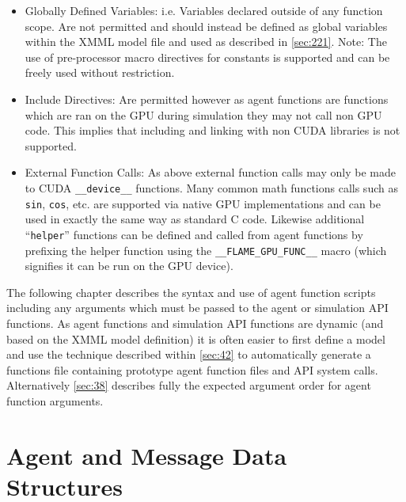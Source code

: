 \documentclass[11pt, a4paper, onecolumn, oneside]{report}
\begin{document}
\begin{itemize}
\item Globally Defined Variables: i.e. Variables declared outside of any function scope.
    Are not permitted and should instead be defined as global variables within the XMML model file and used as described in \cref{sec:221}.
    Note: The use of pre-processor macro directives for constants is supported and can be freely used without restriction.
\item Include Directives: Are permitted however as agent functions are functions which are ran on the GPU during simulation they may not call non GPU code.
    This implies that including and linking with non CUDA libraries is not supported.
\item External Function Calls: As above external function calls may only be made to CUDA \texttt{__device__} functions.
    Many common math functions calls such as \texttt{sin}, \texttt{cos}, etc.
    are supported via native GPU implementations and can be used in exactly the same way as standard C code.
    Likewise additional ``\texttt{helper}'' functions can be defined and called from agent functions by prefixing the helper function using the \texttt{__FLAME_GPU_FUNC__} macro (which signifies it can be run on the GPU device).
\end{itemize}

The following chapter describes the syntax and use of agent function scripts including any arguments which must be passed to the agent or simulation API functions.
As agent functions and simulation API functions are dynamic (and based on the XMML model definition) it is often easier to first define a model and use the technique described within \cref{sec:42} to automatically generate a functions file containing prototype agent function files and API system calls.
Alternatively \cref{sec:38} describes fully the expected argument order for agent function arguments.


\section{Agent and Message Data Structures}
\label{sec:32}
\end{document}
